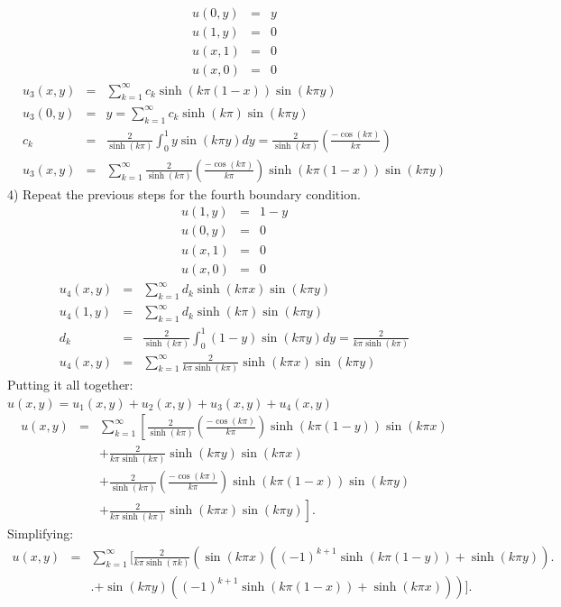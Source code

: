 \documentclass{article}
\newcommand{\bea}{\begin{eqnarray*}}
\newcommand{\eea}{\end{eqnarray*}}
\begin{document}
\bea
u(0,y) &=& y\\
u(1,y) &=& 0\\
u(x,1) &=& 0\\
u(x,0) &=& 0
\eea
\bea
u_3(x,y) &=& \sum_{k=1}^{\infty}{c_k\sinh(k\pi (1-x))\sin(k\pi y)}\\
u_3(0,y) &=& y = \sum_{k=1}^{\infty}{c_k\sinh(k\pi)\sin(k\pi y)}\\
c_k &=& \frac{2}{\sinh(k\pi)}\int_{0}^{1}{y\sin(k\pi y)}dy = \frac{2}{\sinh(k\pi)}\left(\frac{-\cos(k\pi)}{k\pi}\right)\\
u_3(x,y) &=& \sum_{k=1}^{\infty}{\frac{2}{\sinh(k\pi)}\left(\frac{-\cos(k\pi)}{k\pi}\right)\sinh(k\pi (1-x))\sin(k\pi y)}
\eea
4) Repeat the previous steps for the fourth boundary condition.
\bea
u(1,y) &=& 1-y\\
u(0,y) &=& 0\\
u(x,1) &=& 0\\
u(x,0) &=& 0
\eea
\bea
u_4(x,y) &=& \sum_{k=1}^{\infty}{d_k\sinh(k\pi x)\sin(k\pi y)}\\
u_4(1,y) &=& \sum_{k=1}^{\infty}{d_k\sinh(k\pi)\sin(k\pi y)}\\
d_k &=& \frac{2}{\sinh(k\pi)}\int_{0}^{1}{(1-y)\sin(k\pi y)}dy = \frac{2}{k\pi\sinh(k\pi)}\\
u_4(x,y) &=& \sum_{k=1}^{\infty}{\frac{2}{k\pi\sinh(k\pi)}\sinh(k\pi x)\sin(k\pi y)}
\eea
Putting it all together: $u(x,y) = u_1(x,y)+u_2(x,y)+u_3(x,y)+u_4(x,y)$
\bea
u(x,y) &=& \sum_{k=1}^{\infty}\left[\frac{2}{\sinh(k\pi)}\left(\frac{-\cos(k\pi)}{k\pi}\right)\sinh(k\pi (1-y))\sin(k\pi x)\right.\\
& & + \frac{2}{k\pi\sinh(k\pi)}\sinh(k\pi y)\sin(k\pi x)\\
& & + \frac{2}{\sinh(k\pi)}\left(\frac{-\cos(k\pi)}{k\pi}\right)\sinh(k\pi (1-x))\sin(k\pi y)\\
& & \left.+ \frac{2}{k\pi\sinh(k\pi)}\sinh(k\pi x)\sin(k\pi y)\right].
\eea
Simplifying:
\bea
u(x,y) &=&\sum_{k=1}^{\infty}\Bigg[\frac{2}{k\pi\sinh(\pi k)}\left(\sin(k\pi x)((-1)^{k+1}\sinh(k\pi (1-y)) + \sinh(k\pi y))\right.\Bigg.\\
& & \Bigg.\left.+ \sin(k\pi y)\left( (-1)^{k+1}\sinh(k\pi (1-x))+\sinh(k\pi x)\right)\right)\Bigg].
\eea
\end{document}
